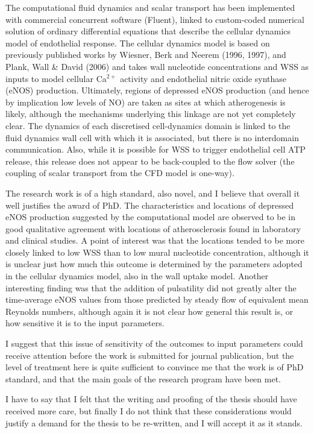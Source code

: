 \documentclass[12pt,twoside]{letter}
\begin{document}
The computational fluid dynamics and scalar transport has been
implemented with commercial concurrent software (Fluent), linked to
custom-coded numerical solution of ordinary differential equations
that describe the cellular dynamics model of endothelial response. The
cellular dynamics model is based on previously published works by
Wiesner, Berk and Neerem (1996, 1997), and Plank, Wall \& David (2006)
and takes wall nucleotide concentrations and WSS as inputs to model
cellular Ca$^{2+}$ activity and endothelial nitric oxide synthase
(eNOS) production.  Ultimately, regions of depressed eNOS production
(and hence by implication low levels of NO) are taken as sites at
which atherogenesis is likely, although the mechanisms underlying this
linkage are not yet completely clear.  The dynamics of each
discretised cell-dynamics domain is linked to the fluid dynamics wall
cell with which it is associated, but there is no interdomain
communication.  Also, while it is possible for WSS to trigger
endothelial cell ATP release, this release does not appear to be
back-coupled to the flow solver (the coupling of scalar transport from
the CFD model is one-way).

The research work is of a high standard, also novel, and I believe
that overall it well justifies the award of PhD. The characteristics
and locations of depressed eNOS production suggested by the
computational model are observed to be in good qualitative agreement
with locations of atherosclerosis found in laboratory and clinical
studies.  A point of interest was that the locations tended to be more
closely linked to low WSS than to low mural nucleotide concentration,
although it is unclear just how much this outcome is determined by the
parameters adopted in the cellular dynamics model, also in the wall
uptake model. Another interesting finding was that the addition of
pulsatility did not greatly alter the time-average eNOS values from
those predicted by steady flow of equivalent mean Reynolds numbers,
although again it is not clear how general this result is, or how
sensitive it is to the input parameters.  

I suggest that this issue of sensitivity of the outcomes to input
parameters could receive attention before the work is submitted for
journal publication, but the level of treatment here is quite
sufficient to convince me that the work is of PhD standard, and that
the main goals of the research program have been met.

I have to say that I felt that the writing and proofing of the thesis
should have received more care, but finally I do not think that these
considerations would justify a demand for the thesis to be re-written,
and I will accept it as it stands.
\end{document}
